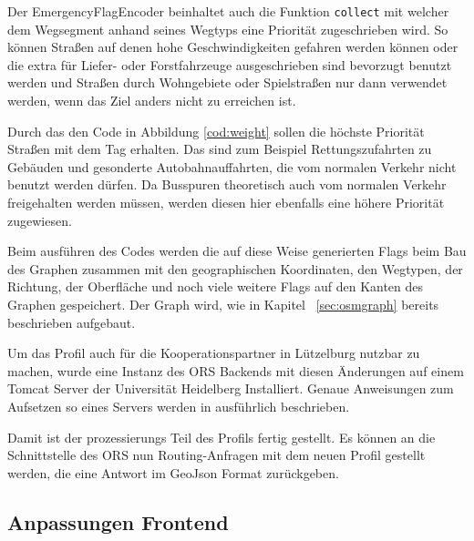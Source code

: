 Der EmergencyFlagEncoder beinhaltet auch die Funktion \texttt{collect} mit welcher dem Wegsegment anhand seines Wegtyps eine Priorität zugeschrieben wird. So können Straßen auf denen hohe Geschwindigkeiten gefahren werden können oder die extra für Liefer- oder Forstfahrzeuge ausgeschrieben sind bevorzugt benutzt werden und Straßen durch Wohngebiete oder Spielstraßen nur dann verwendet werden, wenn das Ziel anders nicht zu erreichen ist.


Durch das den Code in Abbildung \ref{cod:weight} sollen die höchste Priorität Straßen mit dem Tag  erhalten. Das sind zum Beispiel Rettungszufahrten zu Gebäuden und gesonderte Autobahnauffahrten, die vom normalen Verkehr nicht benutzt werden dürfen. Da Busspuren theoretisch auch vom normalen Verkehr freigehalten werden müssen, werden diesen hier ebenfalls eine höhere Priorität zugewiesen.

Beim ausführen des Codes werden die auf diese Weise generierten Flags beim Bau des Graphen zusammen mit den geographischen Koordinaten, den Wegtypen, der Richtung, der Oberfläche und noch viele weitere Flags auf den Kanten des Graphen gespeichert. Der Graph wird, wie in Kapitel ~\ref{sec:osmgraph} bereits beschrieben aufgebaut.

Um das Profil auch für die Kooperationspartner in Lützelburg nutzbar zu machen, wurde eine Instanz des ORS Backends mit diesen Änderungen auf einem Tomcat Server der Universität Heidelberg Installiert. Genaue Anweisungen zum Aufsetzen so eines Servers werden in \cite{neisdoktor} ausführlich beschrieben. 

Damit ist der prozessierungs Teil des Profils fertig gestellt. Es können an die Schnittstelle des ORS nun Routing-Anfragen mit dem neuen Profil gestellt werden, die eine Antwort im GeoJson Format zurückgeben.

%
%
%
%

\subsection{Anpassungen Frontend}

